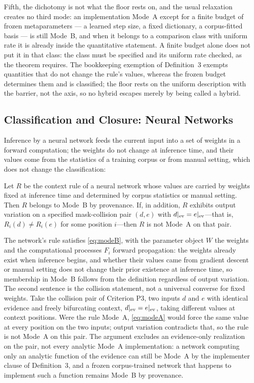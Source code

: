 Fifth, the dichotomy is not what the floor rests on, and the usual relaxation creates no third mode: an implementation Mode~A except for a finite budget of frozen metaparameters --- a learned step size, a fixed dictionary, a corpus-fitted basis --- is still Mode~B, and when it belongs to a comparison class with uniform rate it is already inside the quantitative statement. A finite budget alone does not put it in that class: the class must be specified and its uniform rate checked, as the theorem requires. The bookkeeping exemption of Definition~3 exempts quantities that do not change the rule's values, whereas the frozen budget determines them and is classified; the floor rests on the uniform description with the barrier, not the axis, so no hybrid escapes merely by being called a hybrid.

\subsection{Classification and Closure: Neural Networks}

Inference by a neural network feeds the current input into a set of weights in a forward computation; the weights do not change at inference time, and their values come from the statistics of a training corpus or from manual setting, which does not change the classification:

\begin{proposition}
Let $R$ be the context rule of a neural network whose values are carried by weights fixed at inference time and determined by corpus statistics or manual setting. Then $R$ belongs to Mode~B by provenance. If, in addition, $R$ exhibits output variation on a specified mask-collision pair $(d,e)$ with $d|_{\mathrm{ev}}=e|_{\mathrm{ev}}$---that is, $R_i(d)\neq R_i(e)$ for some position $i$---then $R$ is not Mode~A on that pair.
\end{proposition}

\argument The network's rule satisfies \eqref{eq:modeB}, with the parameter object $W$ the weights and the computational processes $F_i$ forward propagation: the weights already exist when inference begins, and whether their values came from gradient descent or manual setting does not change their prior existence at inference time, so membership in Mode~B follows from the definition regardless of output variation. The second sentence is the collision statement, not a universal converse for fixed weights. Take the collision pair of Criterion P3, two inputs $d$ and $e$ with identical evidence and freely bifurcating context, $d|_{\mathrm{ev}} = e|_{\mathrm{ev}}$, taking different values at context positions. Were the rule Mode~A, \eqref{eq:modeA} would force the same value at every position on the two inputs; output variation contradicts that, so the rule is not Mode~A on this pair. The argument excludes an evidence-only realization on the pair, not every analytic Mode~A implementation: a network computing only an analytic function of the evidence can still be Mode~A by the implementer clause of Definition~3, and a frozen corpus-trained network that happens to implement such a function remains Mode~B by provenance.\qedbox

